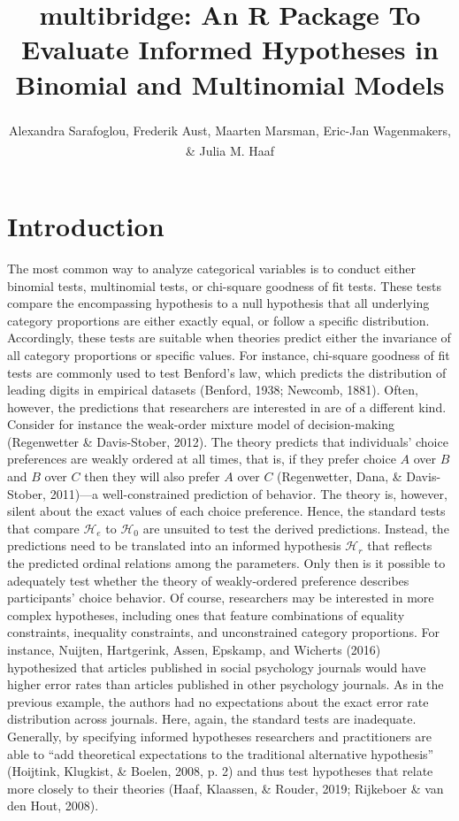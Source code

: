 \documentclass[
  english,
  man,floatsintext]{apa6}
\title{multibridge: An R Package To Evaluate Informed Hypotheses in Binomial and Multinomial Models}
\author{Alexandra Sarafoglou\textsuperscript{}, Frederik Aust\textsuperscript{}, Maarten Marsman\textsuperscript{}, Eric-Jan Wagenmakers\textsuperscript{}, \& Julia M. Haaf\textsuperscript{}}
\date{}
\affiliation{\vspace{0.5cm}\textsuperscript{} University of Amsterdam}
\begin{document}
\maketitle

\hypertarget{introduction}{%
\section{Introduction}\label{introduction}}

\noindent The most common way to analyze categorical variables is to conduct either binomial tests, multinomial tests, or chi-square goodness of fit tests. These tests compare the encompassing hypothesis to a null hypothesis that all underlying category proportions are either exactly equal, or follow a specific distribution. Accordingly, these tests are suitable when theories predict either the invariance of all category proportions or specific values. For instance, chi-square goodness of fit tests are commonly used to test Benford's law, which predicts the distribution of leading digits in empirical datasets (Benford, 1938; Newcomb, 1881). Often, however, the predictions that researchers are interested in are of a different kind. Consider for instance the weak-order mixture model of decision-making (Regenwetter \& Davis-Stober, 2012). The theory predicts that individuals' choice preferences are weakly ordered at all times, that is, if they prefer choice \(A\) over \(B\) and \(B\) over \(C\) then they will also prefer \(A\) over \(C\) (Regenwetter, Dana, \& Davis-Stober, 2011)---a well-constrained prediction of behavior. The theory is, however, silent about the exact values of each choice preference. Hence, the standard tests that compare \(\mathcal{H}_e\) to \(\mathcal{H}_0\) are unsuited to test the derived predictions. Instead, the predictions need to be translated into an informed hypothesis \(\mathcal{H}_r\) that reflects the predicted ordinal relations among the parameters. Only then is it possible to adequately test whether the theory of weakly-ordered preference describes participants' choice behavior. Of course, researchers may be interested in more complex hypotheses, including ones that feature combinations of equality constraints, inequality constraints, and unconstrained category proportions. For instance, Nuijten, Hartgerink, Assen, Epskamp, and Wicherts (2016) hypothesized that articles published in social psychology journals would have higher error rates than articles published in other psychology journals. As in the previous example, the authors had no expectations about the exact error rate distribution across journals. Here, again, the standard tests are inadequate. Generally, by specifying informed hypotheses researchers and practitioners are able to ``add theoretical expectations to the traditional alternative hypothesis'' (Hoijtink, Klugkist, \& Boelen, 2008, p. 2) and thus test hypotheses that relate more closely to their theories (Haaf, Klaassen, \& Rouder, 2019; Rijkeboer \& van den Hout, 2008).
\end{document}

